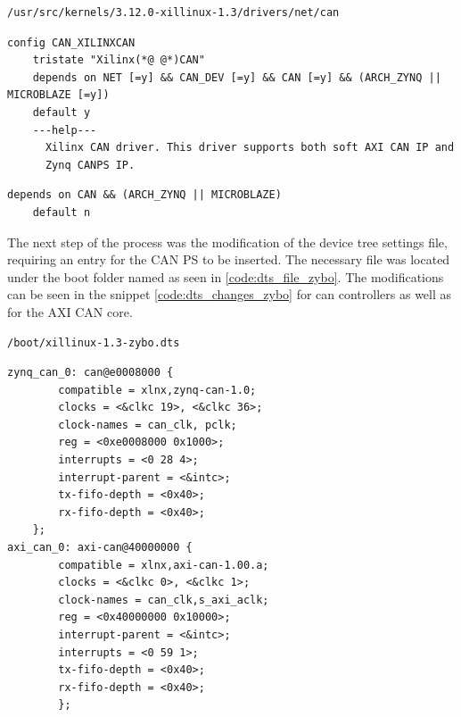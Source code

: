 \begin{lstlisting}[caption={CAN Kconfig pathfile.},numbers=none,label=code:can_kconfig_pathfile]
/usr/src/kernels/3.12.0-xillinux-1.3/drivers/net/can
\end{lstlisting}

\begin{lstlisting}[firstnumber=128,caption={Kconfig file contents from line 128.},label={code:can_kconfig_contents_line128}]
config CAN_XILINXCAN
	tristate "Xilinx(*@ @*)CAN"
	depends on NET [=y] && CAN_DEV [=y] && CAN [=y] && (ARCH_ZYNQ || MICROBLAZE [=y])
	default y
	---help---
	  Xilinx CAN driver. This driver supports both soft AXI CAN IP and
	  Zynq CANPS IP.
\end{lstlisting}

\begin{lstlisting}[firstnumber=130,caption={Original content of lines 130 and 131.},label={code:can_kconfig_original_line130}]
	depends on CAN && (ARCH_ZYNQ || MICROBLAZE)
	default n
\end{lstlisting}

The next step of the process was the modification of the device tree settings file, requiring an entry for the CAN PS to be inserted.
The necessary file was located under the boot folder named as seen in \ref{code:dts_file_zybo}.
The modifications can be seen in the snippet \ref{code:dts_changes_zybo} for can controllers as well as for the AXI CAN core.

\begin{lstlisting}[numbers=none,caption={Device tree settings file and its path.},label={code:dts_file_zybo}]
/boot/xillinux-1.3-zybo.dts
\end{lstlisting}
\begin{lstlisting}[caption={Device tree settings changes.},label={code:dts_changes_zybo}]
zynq_can_0: can@e0008000 {
        compatible = xlnx,zynq-can-1.0;
        clocks = <&clkc 19>, <&clkc 36>;
        clock-names = can_clk, pclk;
        reg = <0xe0008000 0x1000>;
        interrupts = <0 28 4>;
        interrupt-parent = <&intc>;
        tx-fifo-depth = <0x40>;
        rx-fifo-depth = <0x40>;
    };
axi_can_0: axi-can@40000000 {
        compatible = xlnx,axi-can-1.00.a;
        clocks = <&clkc 0>, <&clkc 1>;
        clock-names = can_clk,s_axi_aclk;
        reg = <0x40000000 0x10000>;
        interrupt-parent = <&intc>;
        interrupts = <0 59 1>;
        tx-fifo-depth = <0x40>;
        rx-fifo-depth = <0x40>;
        };
\end{lstlisting}

